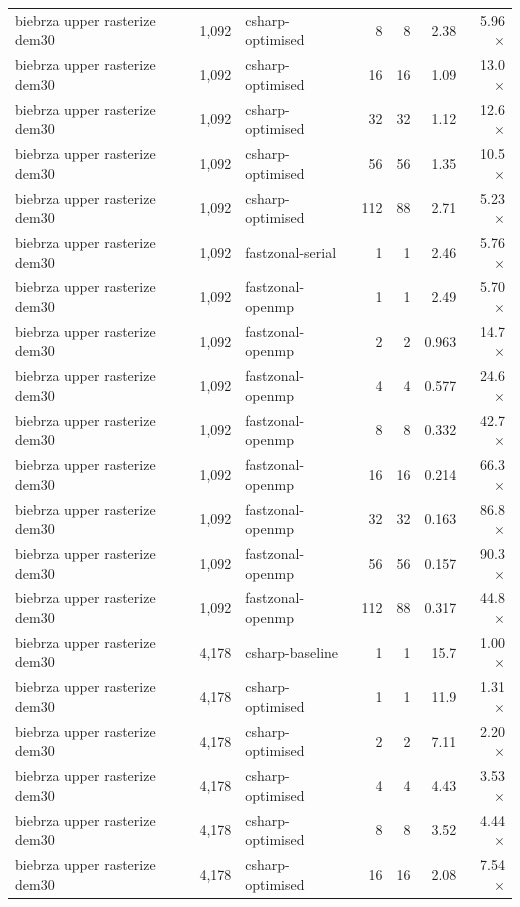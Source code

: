 \begin{tabular}{lrlrrrr}
biebrza upper rasterize dem30 & 1,092 & csharp-optimised & 8 & 8 & 2.38 & 5.96$\times$ \\
biebrza upper rasterize dem30 & 1,092 & csharp-optimised & 16 & 16 & 1.09 & 13.0$\times$ \\
biebrza upper rasterize dem30 & 1,092 & csharp-optimised & 32 & 32 & 1.12 & 12.6$\times$ \\
biebrza upper rasterize dem30 & 1,092 & csharp-optimised & 56 & 56 & 1.35 & 10.5$\times$ \\
biebrza upper rasterize dem30 & 1,092 & csharp-optimised & 112 & 88 & 2.71 & 5.23$\times$ \\
biebrza upper rasterize dem30 & 1,092 & fastzonal-serial & 1 & 1 & 2.46 & 5.76$\times$ \\
biebrza upper rasterize dem30 & 1,092 & fastzonal-openmp & 1 & 1 & 2.49 & 5.70$\times$ \\
biebrza upper rasterize dem30 & 1,092 & fastzonal-openmp & 2 & 2 & 0.963 & 14.7$\times$ \\
biebrza upper rasterize dem30 & 1,092 & fastzonal-openmp & 4 & 4 & 0.577 & 24.6$\times$ \\
biebrza upper rasterize dem30 & 1,092 & fastzonal-openmp & 8 & 8 & 0.332 & 42.7$\times$ \\
biebrza upper rasterize dem30 & 1,092 & fastzonal-openmp & 16 & 16 & 0.214 & 66.3$\times$ \\
biebrza upper rasterize dem30 & 1,092 & fastzonal-openmp & 32 & 32 & 0.163 & 86.8$\times$ \\
biebrza upper rasterize dem30 & 1,092 & fastzonal-openmp & 56 & 56 & 0.157 & 90.3$\times$ \\
biebrza upper rasterize dem30 & 1,092 & fastzonal-openmp & 112 & 88 & 0.317 & 44.8$\times$ \\
biebrza upper rasterize dem30 & 4,178 & csharp-baseline & 1 & 1 & 15.7 & 1.00$\times$ \\
biebrza upper rasterize dem30 & 4,178 & csharp-optimised & 1 & 1 & 11.9 & 1.31$\times$ \\
biebrza upper rasterize dem30 & 4,178 & csharp-optimised & 2 & 2 & 7.11 & 2.20$\times$ \\
biebrza upper rasterize dem30 & 4,178 & csharp-optimised & 4 & 4 & 4.43 & 3.53$\times$ \\
biebrza upper rasterize dem30 & 4,178 & csharp-optimised & 8 & 8 & 3.52 & 4.44$\times$ \\
biebrza upper rasterize dem30 & 4,178 & csharp-optimised & 16 & 16 & 2.08 & 7.54$\times$ \\

\end{tabular}
